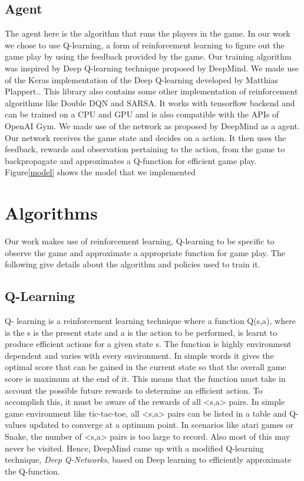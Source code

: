 \documentclass[conference,10pt]{IEEEtran}
\begin{document}
	\subsection{Agent}
	The agent here is the algorithm that runs the players in the game. In our work we chose to use Q-learning, a form of reinforcement learning to figure out the game play by using the feedback provided by the game. Our training algorithm was inspired by Deep Q-learning technique proposed by DeepMind\cite{n4}.
	\break
	\break
	We made use of the Keras implementation of the Deep Q-learning developed by Matthias Plappert.\cite{n5}. This library also contains some other implementation of reinforcement algorithms like Double DQN and SARSA. It works with tensorflow backend and can be trained on a CPU and GPU and is also compatible with the APIs of OpenAI Gym.
	\break
	\break
	We made use of the network as proposed by DeepMind as a agent. Our network receives the game state and decides on a action. It then uses the feedback, rewards and observation pertaining to the action, from the game to backpropagate and approximates a Q-function for efficient game play.
	Figure\ref{model} shows the model that we implemented

	\section{Algorithms}
	Our work makes use of reinforcement learning, Q-learning to be specific to observe the game and approximate a appropriate function for game play. The following give details about the algorithm and policies used to train it.

	\subsection{Q-Learning}
	Q- learning is a reinforcement learning technique where a function Q(s,a), where is the s is the present state and a is the action to be performed, is learnt to produce efficient actions for a given state s. The function is highly environment dependent and varies with every environment. In simple words it gives the optimal score that can be gained in the current state so that the overall game score is maximum at the end of it. This means that the function must take in account the possible future rewards to determine an efficient action. To accomplish this, it must be aware of the rewards of all <s,a> pairs. In simple game environment like tic-tac-toe, all <s,a> pairs can be listed in a table and Q-values updated to converge at a optimum point. In scenarios like atari games or Snake, the number of <s,a> pairs is too large to record. Also most of this may never be visited. Hence, DeepMind came up with a modified Q-learning technique, \textit{Deep Q-Networks}, based on Deep learning to efficiently approximate the Q-function.
\end{document}
